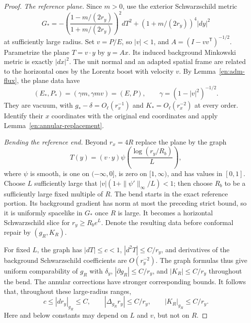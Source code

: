 \begin{proof}
\emph{The reference plane.}
Since $m>0$, use the exterior Schwarzschild metric
\begin{equation}\label{en:schwarzschild-reference}
 G_*=-\left(\frac{1-m/(2r_y)}{1+m/(2r_y)}\right)^2dT^2
                  +(1+m/(2r_y))^4|dy|^2
\end{equation}
at sufficiently large radius. Set $v=P/E$, so $|v|<1$, and
$A=(I-vv^{\mathsf T})^{-1/2}$. Parametrize the plane
$T=v\cdot y$ by $y=Ax$. Its induced background Minkowski metric
is exactly $|dx|^2$. The unit normal and an adapted spatial frame
are related to the horizontal ones by the Lorentz boost with
velocity $v$. By Lemma~\ref{en:adm-flux}, the plane data have
\[
 (E_*,P_*)=(\gamma m,\gamma m v)=(E,P),
 \qquad\gamma=(1-|v|^2)^{-1/2}.
\]
They are vacuum, with $g_*-\delta=O_\ell(r_x^{-1})$ and
$K_*=O_\ell(r_x^{-2})$ at every order. Identify their $x$
coordinates with the original end coordinates and apply
Lemma~\ref{en:annular-replacement}.

\emph{Bending the reference end.}
Beyond $r_x=4R$ replace the plane by the graph
\begin{equation}\label{en:bend-height}
 T(y)=(v\cdot y)\psi\left(\frac{\log(r_y/R_b)}{L}\right),
\end{equation}
where $\psi$ is smooth, is one on $(-\infty,0]$, is zero on
$[1,\infty)$, and has values in $[0,1]$. Choose $L$ sufficiently
large that
$|v|(1+\|\psi'\|_\infty/L)<1$; then choose $R_b$ to be a
sufficiently large fixed multiple of $R$. The bend starts in the
exact reference portion. Its background gradient has norm at
most the preceding strict bound, so it is uniformly spacelike in
$G_*$ once $R$ is large. It becomes a horizontal Schwarzschild
slice for $r_y\geq R_b e^L$. Denote the resulting data before
conformal repair by $(g_R,K_R)$.

For fixed $L$, the graph has $|dT|\leq c<1$,
$|d^2T|\leq C/r_y$, and derivatives of the background Schwarzschild
coefficients are $O(r_y^{-2})$. The graph formulas thus give
uniform comparability of $g_R$ with $\delta_y$,
$|\partial g_R|\leq C/r_y$, and $|K_R|\leq C/r_y$ throughout
the bend. The annular corrections have stronger corresponding
bounds. It follows that, throughout these large-radius ranges,
\begin{equation}\label{en:radial-bounds}
 c\leq |dr_y|_{g_R}\leq C,
 \qquad |\Delta_{g_R}r_y|\leq C/r_y,
 \qquad |K_R|_{g_R}\leq C/r_y.
\end{equation}
Here and below constants may depend on $L$ and $v$, but not on $R$.


\end{proof}
